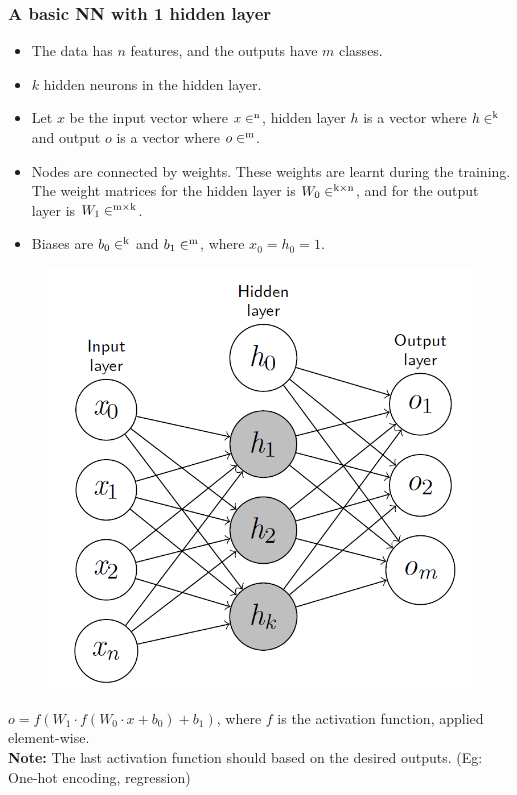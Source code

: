 \documentclass[aspectratio=169, 10pt]{beamer}
\begin{document}
\begin{frame}
    \frametitle{A basic NN with 1 hidden layer}
    
    \begin{itemize}
        \item The data has $n$ features, and the outputs have $m$ classes.
        \item $k$ hidden neurons in the hidden layer.
        \item Let $x$ be the input vector where $x \in \rm^n$, hidden layer $h$ is a vector where $h \in \rm^k$ and output $o$ is a vector where $o \in \rm^m$.
        \item Nodes are connected by weights. These weights are learnt during the training. The weight matrices for the hidden layer is $W_0 \in \rm^{k \times n}$, and for the output layer is $W_1 \in \rm^{m \times k}$.
        \item Biases are $b_0 \in \rm^k$ and $b_1 \in \rm^m$, where $x_0 = h_0 = 1$.
    \end{itemize}

    \begin{figure}
        \centering
        \includegraphics[width=0.18\columnwidth]{../imgs/nn_01.png}
    \end{figure}

    $o = f(W_1 \cdot f(W_0 \cdot x + b_0) + b_1)$, where $f$ is the activation function, applied element-wise.\\

    \textbf{Note:} The last activation function should based on the desired outputs. (Eg: One-hot encoding, regression)
        
\end{frame}

\end{document}
